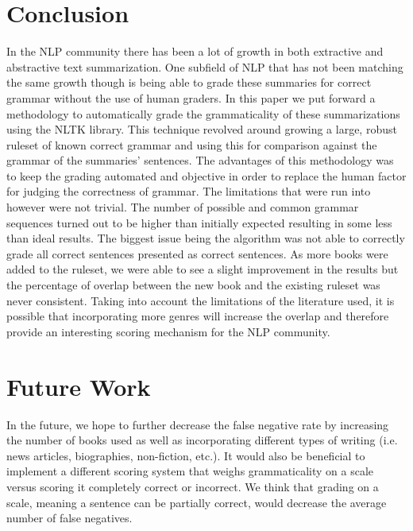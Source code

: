 \documentclass[11pt,a4paper]{article}
\begin{document}
\begin{multicols}{2}
\section{Conclusion}
In the NLP community there has been a lot of growth in both extractive and abstractive text summarization. One subfield of NLP that has not been matching the same growth though is being able to grade these summaries for correct grammar without the use of human graders. In this paper we put forward a methodology to automatically grade the grammaticality of these summarizations using the NLTK library. This technique revolved around growing a large, robust ruleset of known correct grammar and using this for comparison against the grammar of the summaries' sentences. The advantages of this methodology was to keep the grading automated and objective in order to replace the human factor for judging the correctness of grammar. The limitations that were run into however were not trivial. The number of possible and common grammar sequences turned out to be higher than initially expected resulting in some less than ideal results. The biggest issue being the algorithm was not able to correctly grade all correct sentences presented as correct sentences. As more books were added to the ruleset, we were able to see a slight improvement in the results but the percentage of overlap between the new book and the existing ruleset was never consistent. Taking into account the limitations of the literature used, it is possible that incorporating more genres will increase the overlap and therefore provide an interesting scoring mechanism for the NLP community.

\section{Future Work}
In the future, we hope to further decrease the false negative rate by increasing the number of books used as well as incorporating different types of writing (i.e. news articles, biographies, non-fiction, etc.). It would also be beneficial to implement a different scoring system that weighs grammaticality on a scale versus scoring it completely correct or incorrect. We think that grading on a scale, meaning a sentence can be partially correct, would decrease the average number of false negatives.


\end{multicols}
\end{document}
